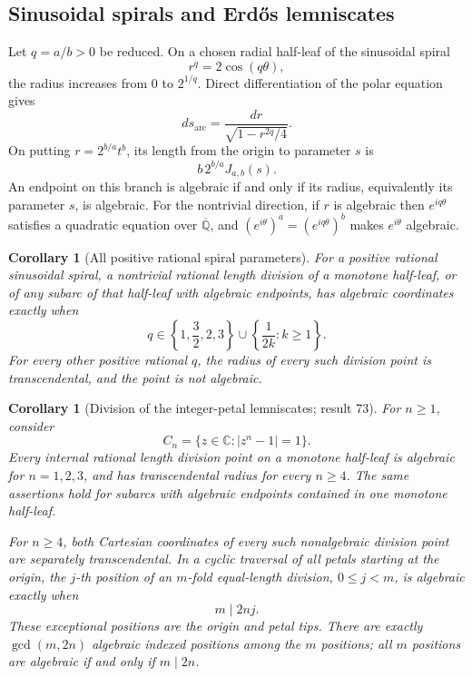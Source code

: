 \documentclass[11pt,a4paper]{article}
\newtheorem{corollary}[theorem]{Corollary}
\theoremstyle{definition}
\theoremstyle{remark}
\numberwithin{equation}{section}
\newcommand{\Qbar}{\overline{\mathbb Q}}
\begin{document}
\subsection{Sinusoidal spirals and Erd\H{o}s lemniscates}

Let $q=a/b>0$ be reduced.  On a chosen radial half-leaf of the
sinusoidal spiral
\[
 r^q=2\cos(q\theta),
\]
the radius increases from $0$ to $2^{1/q}$.  Direct differentiation
of the polar equation gives
\[
 ds_{\mathrm{arc}}=
 \frac{dr}{\sqrt{1-r^{2q}/4}}.
\]
On putting $r=2^{b/a}t^b$, its length from the origin to parameter $s$
is
\begin{equation}
 b\,2^{b/a}J_{a,b}(s).
 \label{bs-spiral-length}
\end{equation}
An endpoint on this branch is algebraic if and only if its radius,
equivalently its parameter $s$, is algebraic.  For the nontrivial
direction, if $r$ is algebraic then $e^{iq\theta}$ satisfies a
quadratic equation over $\Qbar$, and
$(e^{i\theta})^a=(e^{iq\theta})^b$ makes $e^{i\theta}$ algebraic.

\begin{corollary}[All positive rational spiral parameters]
\label{bs-spiral-classification}
For a positive rational sinusoidal spiral, a nontrivial rational
length division of a monotone half-leaf, or of any subarc of that
half-leaf with algebraic endpoints, has algebraic coordinates exactly
when
\[
 q\in\left\{1,\frac32,2,3\right\}
   \cup\left\{\frac1{2k}:k\ge1\right\}.
\]
For every other positive rational $q$, the radius of every such
division point is transcendental, and the point is not algebraic.
\end{corollary}

\begin{corollary}[Division of the integer-petal lemniscates; result 73]
\label{bs-erdos-divisions}
For $n\ge1$, consider
\[
 C_n=\{z\in\mathbb C:|z^n-1|=1\}.
\]
Every internal rational length division point on a monotone half-leaf
is algebraic for $n=1,2,3$, and has transcendental radius for every
$n\ge4$.  The same assertions hold for subarcs with algebraic
endpoints contained in one monotone half-leaf.

For $n\ge4$, both Cartesian coordinates of every such nonalgebraic
division point are separately transcendental.  In a cyclic traversal
of all petals starting at the origin, the $j$-th position of an
$m$-fold equal-length division, $0\le j<m$, is algebraic exactly when
\[
 m\mid 2nj.
\]
These exceptional positions are the origin and petal tips.
There are exactly $\gcd(m,2n)$ algebraic indexed positions among the
$m$ positions; all $m$ positions are algebraic if and only if $m\mid2n$.
\end{corollary}
\end{document}
